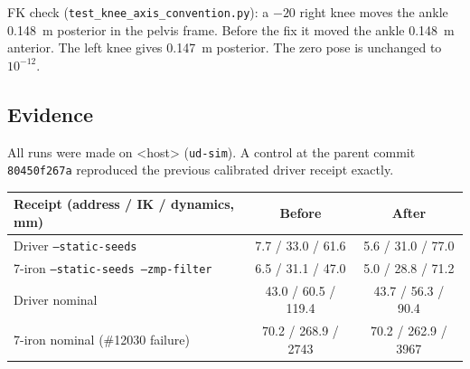 \documentclass[11pt]{article}
\begin{document}
FK check (\texttt{test\_knee\_axis\_convention.py}): a $-20$\textdegree{}
right knee moves the ankle 0.148~m posterior in the pelvis frame. Before the
fix it moved the ankle 0.148~m anterior. The left knee gives 0.147~m
posterior. The zero pose is unchanged to $10^{-12}$.

\subsection{Evidence}
All runs were made on <host> (\texttt{ud-sim}). A control at the
parent commit \texttt{80450f267a} reproduced the previous calibrated driver
receipt exactly.

\begin{center}
\begin{tabular}{lcc}
\hline
Receipt (address / IK / dynamics, mm) & Before & After \\
\hline
Driver \texttt{--static-seeds} & 7.7 / 33.0 / 61.6 & 5.6 / 31.0 / 77.0 \\
7-iron \texttt{--static-seeds --zmp-filter} & 6.5 / 31.1 / 47.0 & 5.0 / 28.8 / 71.2 \\
Driver nominal & 43.0 / 60.5 / 119.4 & 43.7 / 56.3 / 90.4 \\
7-iron nominal (\#12030 failure) & 70.2 / 268.9 / 2743 & 70.2 / 262.9 / 3967 \\
\hline
\end{tabular}
\end{center}
\end{document}

